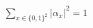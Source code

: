 \documentclass[preview]{standalone}
\begin{document}
\begin{align*}
\sum_{x \in \{0,1\}^2} |\alpha_x|^2 = 1
\end{align*}
\end{document}
